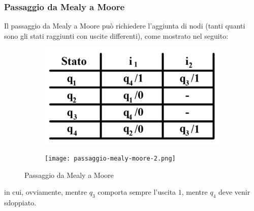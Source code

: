 \documentclass[a4paper]{extarticle}
\begin{document}
\vspace{1em}
\noindent
\subsubsection{Passaggio da Mealy a Moore}
Il passaggio da Mealy a Moore può richiedere l'aggiunta di nodi (tanti quanti sono gli stati raggiunti
con uscite differenti), come mostrato nel seguito:

\noindent
\begin{figure}[H]
    \begin{subfigure}{0.5\textwidth}
        \centering
        \includegraphics[width=1\textwidth]{passaggio-mealy-moore-1.png}
    \end{subfigure}
    \begin{subfigure}{0.4\textwidth}
        \centering
        \texttt{[image: passaggio-mealy-moore-2.png]}
    \end{subfigure}
    \caption{Passaggio da Mealy a Moore}
    \label{fig:passaggio_mealy_moore}
\end{figure}

\vspace{1em}
\noindent
in cui, ovviamente, mentre $q_3$ comporta sempre l'uscita $1$, mentre $q_4$ deve venir sdoppiato.
\end{document}
